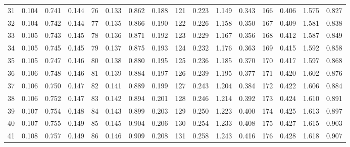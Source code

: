 \begin{table}[!h]
{\begin{tabular}{rrrr|rrrr|rrrr|crrr}
 31 & \tiny{  0.104} &   0.741 & \tiny{  0.144} &  76 & \tiny{  0.133} &   0.862 & \tiny{  0.188} & 121 & \tiny{  0.223} &   1.149 & \tiny{  0.343} & 166 & \tiny{  0.406} &   1.575 & \tiny{  0.827}\\
 32 & \tiny{  0.104} &   0.742 & \tiny{  0.144} &  77 & \tiny{  0.135} &   0.866 & \tiny{  0.190} & 122 & \tiny{  0.226} &   1.158 & \tiny{  0.350} & 167 & \tiny{  0.409} &   1.581 & \tiny{  0.838}\\
 33 & \tiny{  0.105} &   0.743 & \tiny{  0.145} &  78 & \tiny{  0.136} &   0.871 & \tiny{  0.192} & 123 & \tiny{  0.229} &   1.167 & \tiny{  0.356} & 168 & \tiny{  0.412} &   1.587 & \tiny{  0.849}\\
 34 & \tiny{  0.105} &   0.745 & \tiny{  0.145} &  79 & \tiny{  0.137} &   0.875 & \tiny{  0.193} & 124 & \tiny{  0.232} &   1.176 & \tiny{  0.363} & 169 & \tiny{  0.415} &   1.592 & \tiny{  0.858}\\
 35 & \tiny{  0.105} &   0.747 & \tiny{  0.146} &  80 & \tiny{  0.138} &   0.880 & \tiny{  0.195} & 125 & \tiny{  0.236} &   1.185 & \tiny{  0.370} & 170 & \tiny{  0.417} &   1.597 & \tiny{  0.868}\\
 36 & \tiny{  0.106} &   0.748 & \tiny{  0.146} &  81 & \tiny{  0.139} &   0.884 & \tiny{  0.197} & 126 & \tiny{  0.239} &   1.195 & \tiny{  0.377} & 171 & \tiny{  0.420} &   1.602 & \tiny{  0.876}\\
 37 & \tiny{  0.106} &   0.750 & \tiny{  0.147} &  82 & \tiny{  0.141} &   0.889 & \tiny{  0.199} & 127 & \tiny{  0.243} &   1.204 & \tiny{  0.384} & 172 & \tiny{  0.422} &   1.606 & \tiny{  0.884}\\
 38 & \tiny{  0.106} &   0.752 & \tiny{  0.147} &  83 & \tiny{  0.142} &   0.894 & \tiny{  0.201} & 128 & \tiny{  0.246} &   1.214 & \tiny{  0.392} & 173 & \tiny{  0.424} &   1.610 & \tiny{  0.891}\\
 39 & \tiny{  0.107} &   0.754 & \tiny{  0.148} &  84 & \tiny{  0.143} &   0.899 & \tiny{  0.203} & 129 & \tiny{  0.250} &   1.223 & \tiny{  0.400} & 174 & \tiny{  0.425} &   1.613 & \tiny{  0.897}\\
 40 & \tiny{  0.107} &   0.755 & \tiny{  0.149} &  85 & \tiny{  0.145} &   0.904 & \tiny{  0.206} & 130 & \tiny{  0.254} &   1.233 & \tiny{  0.408} & 175 & \tiny{  0.427} &   1.615 & \tiny{  0.903}\\
 41 & \tiny{  0.108} &   0.757 & \tiny{  0.149} &  86 & \tiny{  0.146} &   0.909 & \tiny{  0.208} & 131 & \tiny{  0.258} &   1.243 & \tiny{  0.416} & 176 & \tiny{  0.428} &   1.618 & \tiny{  0.907}\\

\end{tabular}}
\end{table}
